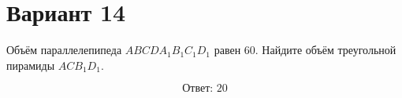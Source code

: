 \documentclass[12pt,a4paper]{article}
\begin{document}
\section*{Вариант 14}

Объём параллелепипеда \(ABCDA_1B_1C_1D_1\) равен 60. Найдите объём треугольной пирамиды \(ACB_1D_1\).

\begin{center}
\end{center}

\[
\boxed{\text{Ответ: }20}
\]
\end{document}
